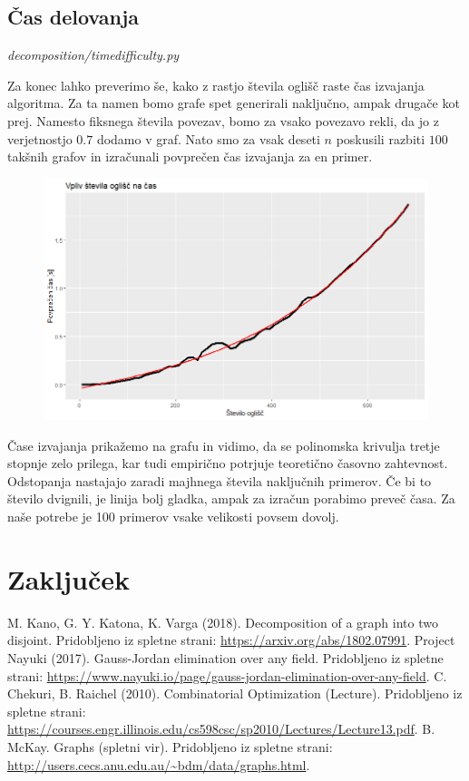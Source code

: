\documentclass[12pt,a4paper]{amsart}
\theoremstyle{definition} %
\theoremstyle{plain} %
\begin{document}
\subsection{Čas delovanja}
\emph{decomposition/timedifficulty.py}

Za konec lahko preverimo še, kako z rastjo števila oglišč raste čas izvajanja algoritma.
Za ta namen bomo grafe spet generirali naključno, ampak drugače kot prej. Namesto fiksnega števila
povezav, bomo za vsako povezavo rekli, da jo z verjetnostjo $0.7$ dodamo v graf.
Nato smo za vsak deseti $n$ poskusili razbiti $100$ takšnih grafov in izračunali povprečen čas izvajanja za en primer.

\begin{figure}[h]
\centering
\includegraphics[width=1\textwidth]{images/timed.png}
\end{figure}


Čase izvajanja prikažemo na grafu in vidimo, da se polinomska krivulja tretje stopnje zelo prilega,
kar tudi empirično potrjuje teoretično časovno zahtevnost. Odstopanja nastajajo zaradi majhnega števila
naključnih primerov. Če bi to število dvignili, je linija bolj gladka, ampak za izračun porabimo preveč časa.
Za naše potrebe je 100 primerov vsake velikosti povsem dovolj.


\section{Zaključek}

\begin{thebibliography}{9}

 M. Kano, G. Y. Katona, K. Varga (2018). Decomposition of a graph into two disjoint. Pridobljeno iz spletne strani: \url{https://arxiv.org/abs/1802.07991}.
 Project Nayuki (2017). Gauss-Jordan elimination over any field. Pridobljeno iz spletne strani: \url{https://www.nayuki.io/page/gauss-jordan-elimination-over-any-field}.
 C. Chekuri, B. Raichel (2010). Combinatorial Optimization (Lecture). Pridobljeno iz spletne strani: \url{https://courses.engr.illinois.edu/cs598csc/sp2010/Lectures/Lecture13.pdf}.
 B. McKay. Graphs (spletni vir). Pridobljeno iz spletne strani: \url{http://users.cecs.anu.edu.au/~bdm/data/graphs.html}.


\end{thebibliography}
\end{document}
